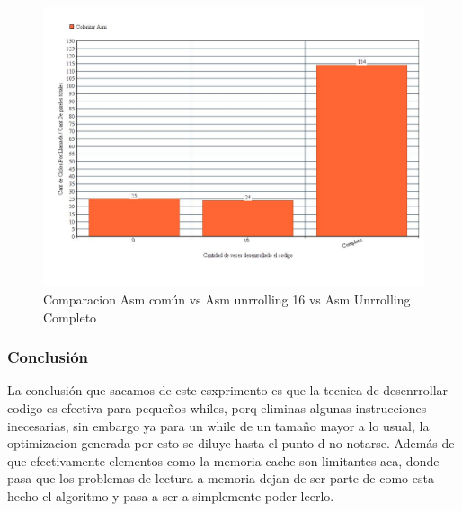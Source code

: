 \begin{figure}[H]
\centering
\captionsetup{justification=centering}
	\includegraphics[width = 15 cm, height = 8 cm]{imagenes/unroll.jpg}
	\caption[center]{Comparacion Asm común vs Asm unrrolling 16  vs Asm Unrrolling Completo}
\end{figure}
\medskip
	
\subsubsection{Conclusión}
\par{La conclusión que sacamos de este esxprimento es que la tecnica de desenrrollar codigo es efectiva para pequeños whiles, porq eliminas algunas instrucciones inecesarias, sin embargo ya para un while de un tamaño mayor a lo usual, la optimizacion generada por esto se diluye hasta el punto d  no notarse. Además de que efectivamente elementos como la memoria cache son limitantes aca, donde pasa que los problemas de lectura a memoria dejan de ser parte de como esta hecho el algoritmo y pasa a ser a simplemente poder leerlo.}